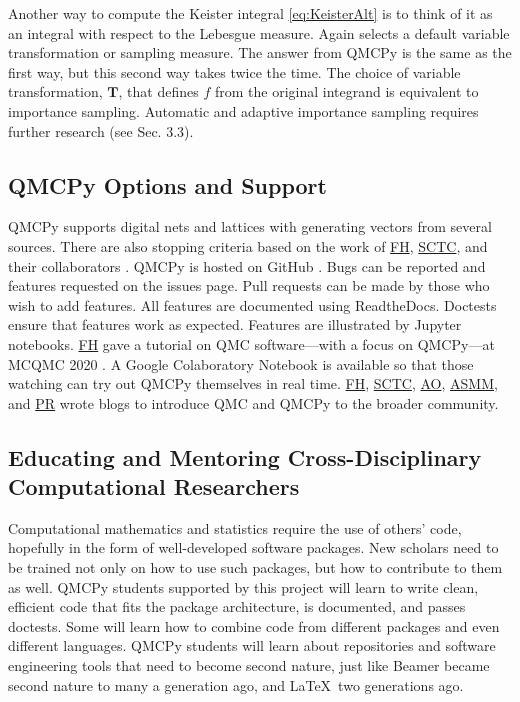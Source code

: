 \documentclass[11pt]{NSFamsart}
\newcommand{\FH}{\hyperlink{FHlink}{FH}\xspace}
\newcommand{\SCTC}{\hyperlink{SCTClink}{SCTC}\xspace}
\newcommand{\AO}{\hyperlink{AOlink}{AO}\xspace}
\newcommand{\MM}{\hyperlink{MMlink}{MM}\xspace}
\newcommand{\AS}{\hyperlink{ASlink}{AS}\xspace}
\newcommand{\PR}{\hyperlink{PRlink}{PR}\xspace}
\newcommand{\bT}{{\boldsymbol{T}}}
\begin{document}
Another way to compute the Keister integral \eqref{eq:KeisterAlt} is to think of it as an integral with respect to the Lebesgue measure.  Again  selects a default variable transformation or sampling measure.  The answer from QMCPy is the same as the first way, but this second way takes twice the time.  The choice of variable transformation, $\bT$, that defines $f$ from the original integrand is equivalent to importance sampling.  Automatic and adaptive importance sampling requires further research (see Sec. 3.3).

\subsection*{QMCPy Options and Support}
QMCPy supports digital nets and lattices with generating vectors from several sources.  There are also stopping criteria based on the work of \FH, \SCTC, and their collaborators \cite{HicEtal14a, HicJim16a, JimHic16a,RatHic19a}.  QMCPy is hosted on GitHub \cite{QMCPy2020a}. Bugs can be reported and features requested on the issues page.  Pull requests can be made by those who wish to add features.  All features are documented \cite{QMCPyDocs} using ReadtheDocs.  Doctests ensure that features work as expected. Features are illustrated by Jupyter notebooks.  \FH gave a tutorial on QMC software---with a focus on QMCPy---at MCQMC 2020 \cite{MCQMC2020QMCPyTut}.  A Google Colaboratory Notebook \cite{QMCPyTutColab2020} is available so that those watching  can try out QMCPy themselves in real time.  \FH, \SCTC, \AO, \AS \MM, and \PR wrote  blogs \cite{QMCBlog} to introduce QMC and QMCPy to the broader community.

\subsection{Educating and Mentoring Cross-Disciplinary Computational Researchers}
Computational mathematics and statistics require the use of others' code, hopefully in the form of well-developed software packages.  New scholars need to be trained not only on how to use such packages, but how to contribute to them as well.  QMCPy students supported by this project will learn to write clean, efficient code that fits the package architecture, is documented, and passes doctests.  Some will learn how to combine code from different packages and even different languages.  QMCPy students will learn about repositories and software engineering tools that need to become second nature, just like Beamer became second nature to many a generation ago, and \LaTeX\ two generations ago.
\end{document}
